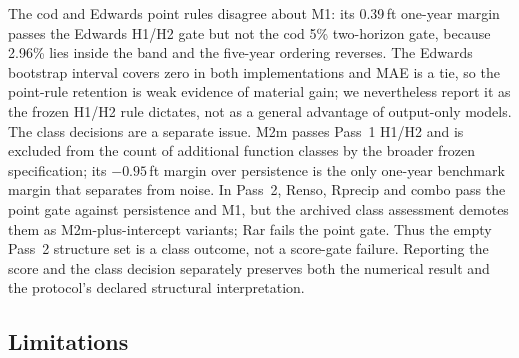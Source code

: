 The cod and Edwards point rules disagree about M1: its 0.39\,ft one-year margin passes the Edwards H1/H2 gate but not the cod 5\% two-horizon gate, because 2.96\% lies inside the band and the five-year ordering reverses. The Edwards bootstrap interval covers zero in both implementations and MAE is a tie, so the point-rule retention is weak evidence of material gain; we nevertheless report it as the frozen H1/H2 rule dictates, not as a general advantage of output-only models. The class decisions are a separate issue. M2m passes Pass~1 H1/H2 and is excluded from the count of additional function classes by the broader frozen specification; its $-0.95$\,ft margin over persistence is the only one-year benchmark margin that separates from noise. In Pass~2, Renso, Rprecip and combo pass the point gate against persistence and M1, but the archived class assessment demotes them as M2m-plus-intercept variants; Rar fails the point gate. Thus the empty Pass~2 structure set is a class outcome, not a score-gate failure. Reporting the score and the class decision separately preserves both the numerical result and the protocol's declared structural interpretation.

\subsection{Limitations}\label{sec:limits}

